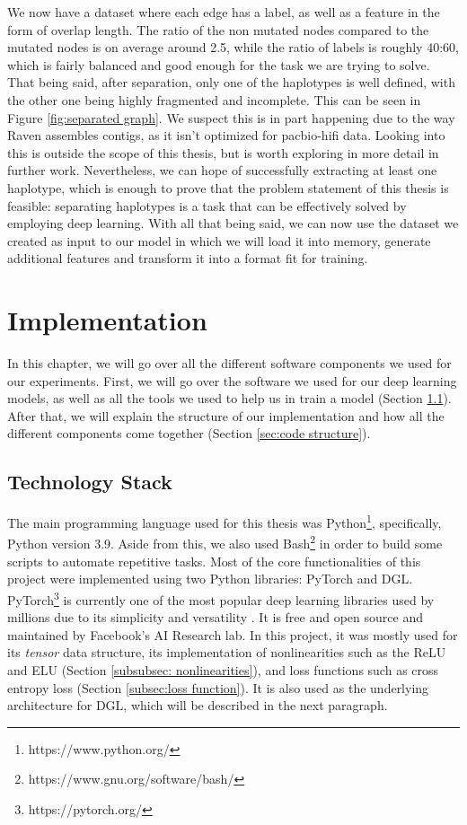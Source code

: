 \documentclass[times, utf8, diplomski, english]{fer_eng}
\begin{document}
We now have a dataset where each edge has a label, as well as a feature in the form of overlap length. The ratio of the non mutated nodes compared to the mutated nodes is on average around 2.5, while the ratio of labels is roughly 40:60, which is fairly balanced and good enough for the task we are trying to solve. That being said, after separation, only one of the haplotypes is well defined, with the other one being highly fragmented and incomplete. This can be seen in Figure \ref{fig:separated graph}. We suspect this is in part happening due to the way Raven assembles contigs, as it isn't optimized for pacbio-hifi data. Looking into this is outside the scope of this thesis, but is worth exploring in more detail in further work. Nevertheless, we can hope of successfully extracting at least one haplotype, which is enough to prove that the problem statement of this thesis is feasible: separating haplotypes is a task that can be effectively solved by employing deep learning. With all that being said, we can now use the dataset we created as input to our model in which we will load it into memory, generate additional features and transform it into a format fit for training.

\chapter{Implementation}

In this chapter, we will go over all the different software components we used for our experiments. First, we will go over the software we used for our deep learning models, as well as all the tools we used to help us in train a model (Section \ref{sec:technology stack}). After that, we will explain the structure of our implementation and how all the different components come together (Section \ref{sec:code structure}).

\section{Technology Stack}
\label{sec:technology stack}

The main programming language used for this thesis was Python\footnote{https://www.python.org/}, specifically, Python version 3.9. Aside from this, we also used Bash\footnote{https://www.gnu.org/software/bash/} in order to build some scripts to automate repetitive tasks. Most of the core functionalities of this project were implemented using two Python libraries: PyTorch and DGL. PyTorch\footnote{https://pytorch.org/} is currently one of the most popular deep learning libraries used by millions due to its simplicity and versatility \cite{popular_ml}. It is free and open source and maintained by Facebook's AI Research lab. In this project, it was mostly used for its \textit{tensor} data structure, its implementation of nonlinearities such as the ReLU and ELU (Section \ref{subsubsec: nonlinearities}), and loss functions such as cross entropy loss (Section \ref{subsec:loss function}). It is also used as the underlying architecture for DGL, which will be described in the next paragraph.
\end{document}

